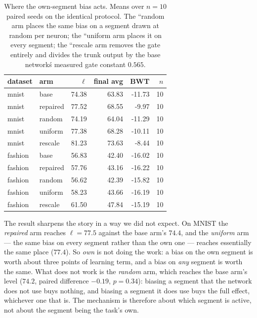 \documentclass[10pt]{article}
\begin{document}
\begin{table}[t]
\centering\small
\caption{Where the own-segment bias acts. Means over $n=10$ paired seeds on the identical protocol. The ``random arm places the same bias on a segment drawn at random per neuron; the ``uniform arm places it on every segment; the ``rescale arm removes the gate entirely and divides the trunk output by the base network\'s measured gate constant $0.565$.}
\label{tab:ctrl-specificity}
\begin{tabular}{llrrrr}
\toprule
dataset & arm & $\ell$ & final avg & BWT & $n$ \\
\midrule
mnist & base & 74.38 & 63.83 & -11.73 & 10 \\
mnist & repaired & 77.52 & 68.55 & -9.97 & 10 \\
mnist & random & 74.19 & 64.04 & -11.29 & 10 \\
mnist & uniform & 77.38 & 68.28 & -10.11 & 10 \\
mnist & rescale & 81.23 & 73.63 & -8.44 & 10 \\
fashion & base & 56.83 & 42.40 & -16.02 & 10 \\
fashion & repaired & 57.76 & 43.16 & -16.22 & 10 \\
fashion & random & 56.62 & 42.39 & -15.82 & 10 \\
fashion & uniform & 58.23 & 43.66 & -16.19 & 10 \\
fashion & rescale & 61.50 & 47.84 & -15.19 & 10 \\
\bottomrule
\end{tabular}
\end{table}

The result sharpens the story in a way we did not expect. On MNIST the
\emph{repaired} arm reaches $\ell=77.5$ against the base arm's $74.4$,
and the \emph{uniform} arm --- the same bias on every segment rather
than the own one --- reaches essentially the same place ($77.4$). So
\emph{own} is not doing the work: a bias on the own segment is worth
about three points of learning term, and a bias on \emph{any} segment is
worth the same. What does not work is the \emph{random} arm, which
reaches the base arm's level ($74.2$, paired difference $-0.19$,
$p=0.34$): biasing a segment that the network does not use buys
nothing, and biasing a segment it does use buys the full effect,
whichever one that is. The mechanism is therefore about which segment
is active, not about the segment being the task's own.
\end{document}
